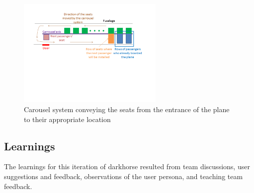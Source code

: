 \begin{easylist}[itemize]
\begin{figure}[h]
  \centering
     \includegraphics[width=7cm]{images/carousel_for_the_dummies.png}
   \caption{Carousel system conveying the seats from the entrance of the plane to their appropriate location}
  \label{fig:Carousel_system}
\end{figure} 
\end{easylist}

\subsection{Learnings}
The learnings for this iteration of darkhorse resulted from team discussions, user suggestions and feedback, observations of the user persona, and teaching team feedback. \\

